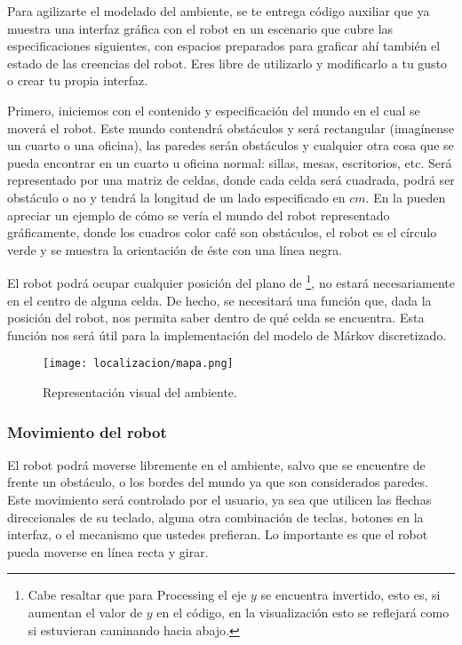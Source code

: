 \noindent Para agilizarte el modelado del ambiente, se te entrega código auxiliar que ya muestra una interfaz gráfica con el robot en un escenario que cubre las especificaciones siguientes, con espacios preparados para graficar ahí también el estado de las creencias del robot.  Eres libre de utilizarlo y modificarlo a tu gusto o crear tu propia interfaz.

Primero, iniciemos con el contenido y especificación del mundo en el cual se moverá el robot. Este mundo contendrá obstáculos y será rectangular (imagínense un cuarto o una oficina), las paredes serán obstáculos y cualquier otra cosa que se pueda encontrar en un cuarto u oficina normal: sillas, mesas, escritorios, etc. Será representado por una matriz de celdas, donde cada celda será cuadrada, podrá ser obstáculo o no y tendrá la longitud de un lado especificado en \(cm\). En la  pueden apreciar un ejemplo de cómo se vería el mundo del robot representado gráficamente, donde los cuadros color café son obstáculos, el robot es el círculo verde y se muestra la orientación de éste con una línea negra.

El robot podrá ocupar cualquier posición del plano de  \footnote{Cabe resaltar que para Processing el eje \(y\) se encuentra invertido, esto es, si aumentan el valor de \(y\) en el código, en la visualización esto se reflejará como si estuvieran caminando hacia abajo. }, no estará necesariamente en el centro de alguna celda. De hecho, se necesitará una función que, dada la posición del robot, nos permita saber dentro de qué celda se encuentra. Esta función nos será útil para la implementación del modelo de Márkov discretizado.\par

\begin{figure}
  \centering
  \texttt{[image: localizacion/mapa.png]}
  \caption{Representación visual del ambiente.}
  \label{fig:mapa}
\end{figure}

\subsubsection{Movimiento del robot}

\noindent El robot podrá moverse libremente en el ambiente, salvo que se encuentre de frente un obstáculo, o los bordes del mundo ya que son considerados paredes. Este movimiento será controlado por el usuario, ya sea que utilicen las flechas direccionales de su teclado, alguna otra combinación de teclas, botones en la interfaz, o el mecanismo que ustedes prefieran. Lo importante es que el robot pueda moverse en línea recta y girar.\par

